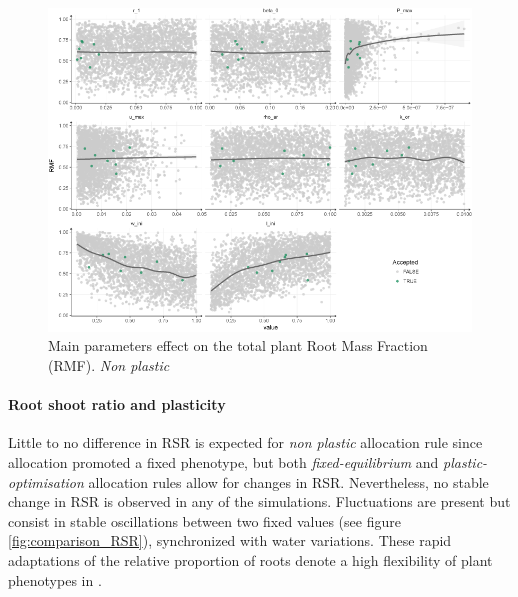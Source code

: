 \begin{figure}
\includegraphics[width = \textwidth]{./2_PP/Figures/Calibration/par_effect_none_RSR.png}
\caption{Main parameters effect on the total plant Root Mass Fraction (RMF). \textit{Non plastic}}\label{fig:sensitivity_RSR}
\end{figure}


\paragraph{Root shoot ratio and plasticity}

Little to no difference in RSR is expected for \textit{non plastic} allocation rule since allocation promoted a fixed phenotype, but both \textit{fixed-equilibrium} and \textit{plastic-optimisation} allocation rules allow for changes in RSR. Nevertheless, no stable change in RSR is observed in any of the simulations. Fluctuations are present but consist in stable oscillations between two fixed values (see figure \ref{fig:comparison_RSR}), synchronized with water variations. These rapid adaptations of the relative proportion of roots denote a high flexibility of plant phenotypes in \model.


